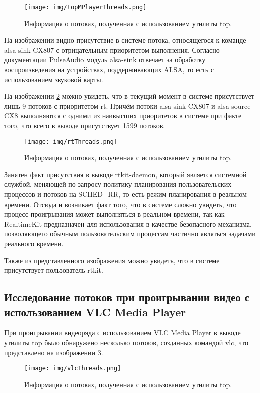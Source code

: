 \begin{figure}[H]
	\centering
	\texttt{[image: img/topMPlayerThreads.png]}
	\caption{Информация о потоках, полученная с использованием утилиты top. }
	\label{fig:topMPlayerThreads}
\end{figure}

На изображении видно присутствие в системе потока, относящегося к команде alsa-sink-CX807 с отрицательным приоритетом выполнения. Согласно документации PulseAudio \cite{pulseAudioDocumentation} модуль alsa-sink отвечает за обработку воспроизведения на устройствах, поддерживающих ALSA, то есть с использованием звуковой карты.

На изображении \ref{fig:rtThreads} можно увидеть, что в текущий момент в системе присутствует лишь 9 потоков с приоритетом rt. Причём потоки alsa-sink-CX807 и alsa-source-CX8 выполняются с одними из наивысших приоритетов в системе при факте того, что всего в выводе присутствует 1599 потоков.

\begin{figure}[H]
	\centering
	\texttt{[image: img/rtThreads.png]}
	\caption{Информация о потоках, полученная с использованием утилиты top. }
	\label{fig:rtThreads}
\end{figure}

Занятен факт присутствия в выводе rtkit-daemon, который является системной службой, меняющей по запросу политику планирования пользовательских процессов и потоков на SCHED\_RR, то есть режим планирования в реальном времени. Отсюда и возникает факт того, что в системе сложно увидеть, что процесс проигрывания может выполняться в реальном времени, так как RealtimeKit предназначен для использования в качестве безопасного механизма, позволяющего обычным пользовательским процессам частично являться задачами реального времени.

Также из представленного изображения можно увидеть, что в системе присутствует пользователь rtkit.

\subsection{Исследование потоков при проигрывании видео с использованием VLC Media Player }
При проигрывании видеоряда с использованием VLC Media Player в выводе утилиты top было обнаружено несколько потоков, созданных командой vlc, что представлено на изображении \ref{fig:vlcThreads}.

\begin{figure}[H]
	\centering
	\texttt{[image: img/vlcThreads.png]}
	\caption{Информация о потоках, полученная с использованием утилиты top. }
	\label{fig:vlcThreads}
\end{figure}

